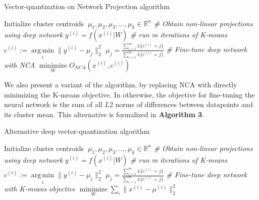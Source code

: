 \documentclass{article}
\DeclareMathOperator*{\argmin}{arg\,min}
\DeclareMathOperator*{\minimize}{minimize}
\begin{document}
\begin{algorithm} 
\caption{Vector-quantization on Network Projection algorithm} 
\label{algo1} 
\begin{algorithmic} 
\STATE Initialize cluster centroids $\: \mu_1, \mu_2, \mu_3,..., 
\mu_k \in \mathbb{R}^n$ 
\STATE \emph{\# Obtain non-linear projections using deep network }
    \STATE $y^{(i)} = f(x^{(i)}| W)$
\ENDFOR 
\STATE \emph{\# run m iterations of K-means }
        \STATE $ c^{(i)} := \underset{i}{\argmin} \| y^{(i)} - \mu_j\|_2^2$
    \ENDFOR 
        \STATE $\mu_j = \frac{\sum_{i=1}^m \mathds{1}\{c^{(i)}=j\}}{\sum_{i=1}^m \mathds{1}\{c^{(i)}=j\}}$
    \ENDFOR 
\ENDFOR 
\STATE \emph{\# Fine-tune deep network with NCA }
\STATE $\underset{W}{\minimize }  O_{NCA}({x^{(i)}, c^{(i)}})$ 
\ENDFOR 
\ENDWHILE
\end{algorithmic} 
\end{algorithm} 

We also present a variant of the algorithm, by replacing NCA with
directly minimizing the K-means objective. In otherwise, the objective
for fine-tuning the neural network is the sum of all $L2$ norms of
differences between datapoints and its cluster mean. This alternative
is formalized in \textbf{Algorithm 3}. 

\begin{algorithm} 
\caption{Alternative deep vector-quantization algorithm} 
\label{algo1} 
\begin{algorithmic} 
\STATE Initialize cluster centroids $\: \mu_1, \mu_2, \mu_3,..., 
\mu_k \in \mathbb{R}^n$ 
\STATE \emph{\# Obtain non-linear projections using deep network } 
    \STATE $y^{(i)} = f(x^{(i)}| W)$ 
\ENDFOR 
\STATE \emph{\# run m iterations of K-means } 
        \STATE $ c^{(i)} := \underset{i}{\argmin} \| y^{(i)} - \mu_j\|_2^2$ 
    \ENDFOR 
        \STATE $\mu_j = \frac{\sum_{i=1}^m \mathds{1}\{c^{(i)}=j\}}{\sum_{i=1}^m \mathds{1}\{c^{(i)}=j\}}$ 
    \ENDFOR 
\ENDFOR 
\STATE \emph{\# Fine-tune deep network with K-means objective } 
\STATE $\underset{W}{\minimize }  \sum_i\|x^{(i)} - \mu^{(i)}\|_2^2$ 
\ENDFOR 
\ENDWHILE 
\end{algorithmic} 
\end{algorithm} 
\end{document}
